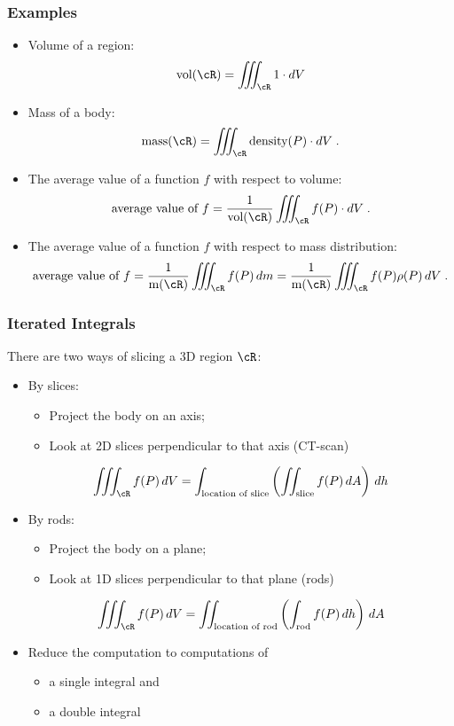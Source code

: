 \begin{frame}
\frametitle{Examples}

\begin{itemize}
  \item Volume of a region:
  $$\text{vol}(\cR) = \int\!\!\!\!\int\!\!\!\!\int_{\cR} 1 \cdot dV$$
  \item Mass of a body:
  $$\text{mass}(\cR) = \int\!\!\!\!\int\!\!\!\!\int_{\cR} \text{density}(P) \cdot dV\; .$$
  \item The average value of a function $f$ with respect to volume:
%
$$\text{average value of }f = \frac{1}{\text{vol}(\cR)} \int\!\!\!\!\int\!\!\!\!\int_{\cR} f(P) \cdot dV\; .$$
  \item The average value of a function $f$ with respect to mass distribution:
%
$$\text{average value of }f = \frac{1}{\text{m}(\cR)} \int\!\!\!\!\int\!\!\!\!\int_{\cR} f(P)\,  dm = \frac{1}{\text{m}(\cR)} \int\!\!\!\!\int\!\!\!\!\int_{\cR} f(P)\rho(P)\, dV\; .$$
\end{itemize}

\end{frame}

\begin{frame}
  \frametitle{Iterated Integrals}

  There are two ways of slicing a 3D region $\cR$:
  \begin{itemize}
    \item By slices:
    \begin{itemize}
      \item Project the body on an axis;
      \item Look at 2D slices perpendicular to that axis (CT-scan)
    \end{itemize}
      $$\iiint_{\cR}f(P) \, dV = \int_{\text{location of slice}} \left(\iint_{\text{slice}} f(P) \, dA\right) \, dh$$
      \item By rods:
      \begin{itemize}
        \item Project the body on a plane;
        \item Look at 1D slices perpendicular to that plane (rods)
      \end{itemize}
      $$\iiint_{\cR}f(P) \, dV = \iint_{\text{location of rod}} \left(\int_{\text{rod}} f(P) \, dh\right) \, dA$$
  \end{itemize}
  \begin{itemize}
    \item Reduce the computation to computations of
    \begin{itemize}
      \item  a single integral and
      \item a double integral
    \end{itemize}
  \end{itemize}
\end{frame}

